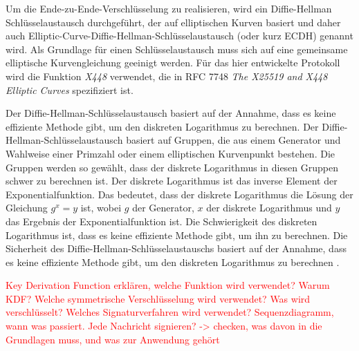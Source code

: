 Um die Ende-zu-Ende-Verschlüsselung zu realisieren, wird ein Diffie-Hellman Schlüsselaustausch durchgeführt, der auf elliptischen Kurven basiert und daher auch Elliptic-Curve-Diffie-Hellman-Schlüsselaustausch (oder kurz ECDH) genannt wird. Als Grundlage für einen Schlüsselaustausch muss sich auf eine gemeinsame elliptische Kurvengleichung geeinigt werden\Parencite[S. 118]{Wong_KryptoPraxis}. Für das hier entwickelte Protokoll wird die Funktion \textit{X448} verwendet, die in RFC 7748 \textit{The X25519 and X448 Elliptic Curves} \parencite{rfc_ellipticCurves} spezifiziert ist.

Der Diffie-Hellman-Schlüsselaustausch basiert auf der Annahme, dass es keine effiziente Methode gibt, um den diskreten Logarithmus zu berechnen. Der Diffie-Hellman-Schlüsselaustausch basiert auf Gruppen, die aus einem Generator und Wahlweise einer Primzahl oder einem elliptischen Kurvenpunkt bestehen. Die Gruppen werden so gewählt, dass der diskrete Logarithmus in diesen Gruppen schwer zu berechnen ist. Der diskrete Logarithmus ist das inverse Element der Exponentialfunktion. Das bedeutet, dass der diskrete Logarithmus die Lösung der Gleichung $g^x = y$ ist, wobei $g$ der Generator, $x$ der diskrete Logarithmus und $y$ das Ergebnis der Exponentialfunktion ist. Die Schwierigkeit des diskreten Logarithmus ist, dass es keine effiziente Methode gibt, um ihn zu berechnen. Die Sicherheit des Diffie-Hellman-Schlüsselaustauschs basiert auf der Annahme, dass es keine effiziente Methode gibt, um den diskreten Logarithmus zu berechnen \Parencite[S. 105-121]{Wong_KryptoPraxis}.

\textcolor{red}{Key Derivation Function erklären, welche Funktion wird verwendet? Warum KDF? Welche symmetrische Verschlüsselung wird verwendet? Was wird verschlüsselt? Welches Signaturverfahren wird verwendet? Sequenzdiagramm, wann was passiert. Jede Nachricht signieren? -> checken, was davon in die Grundlagen muss, und was zur Anwendung gehört}

